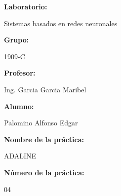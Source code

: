 \documentclass[a4paper]{article}
\begin{document}
    \begin{titlepage}
        \centering
        \par\vspace{0.5cm}

        \par\vspace{1cm}

        \raggedright{\huge\textbf{Laboratorio:}}
        \par\vspace{0.5cm}
        \centering
        {\huge{Sistemas basados en redes neuronales}}
        \par\vspace{0.5cm}

        \raggedright{\huge\textbf{Grupo:}}
        \par\vspace{0.5cm}
        \centering
        {\huge{1909-C}}
        \par\vspace{0.5cm}

        \raggedright{\huge\textbf{Profesor:}}
        \par\vspace{0.5cm}
        \centering
        {\huge{Ing. Garcia Garcia Maribel}}
        \par\vspace{0.5cm}

        \raggedright{\huge\textbf{Alumno:}}
        \par\vspace{0.5cm}
        \centering
        {\huge{Palomino Alfonso Edgar}}
        \par\vspace{0.5cm}

        \raggedright{\huge\textbf{Nombre de la práctica:}}
        \par\vspace{0.5cm}
        \centering
        {\huge{ADALINE}}
        \par\vspace{0.5cm}

        \raggedright{\huge\textbf{Número de la práctica:}}
        \par\vspace{0.5cm}
        \centering
        {\huge{04}}
        \par\vspace{0.5cm}


\end{titlepage}
\end{document}
